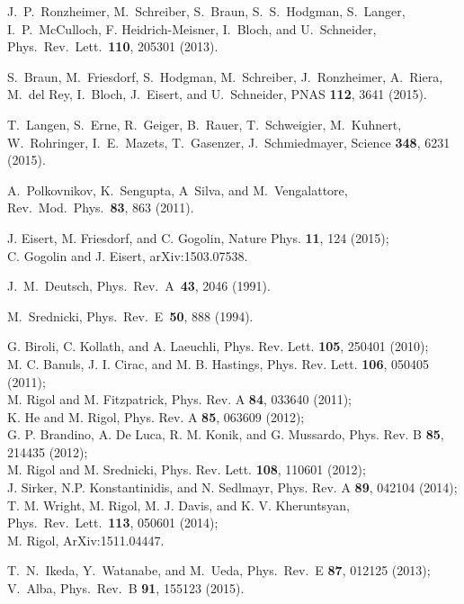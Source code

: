 \documentclass[11pt]{iopart}
\begin{document}
\begin{thebibliography}{99}
J.~P.~Ronzheimer, M.~Schreiber, S.~Braun, S.~S.~Hodgman, S.~Langer, I.~P.~McCulloch,
F. Heidrich-Meisner, I.~Bloch, and U.~Schneider, Phys.\ Rev.\ Lett.\ {\bf 110},
205301 (2013).

S.~Braun, M.~Friesdorf, S.~Hodgman, M.~Schreiber, J.~Ronzheimer, A.~Riera, M.~del Rey,
I.~Bloch, J.~Eisert, and U.~Schneider, PNAS {\bf 112}, 3641 (2015).

T.~Langen, S.~Erne, R.~Geiger, B.~Rauer, T.~Schweigier, M.~Kuhnert, W.~Rohringer,
I.~E.~Mazets, T.~Gasenzer, J.~Schmiedmayer, Science {\bf 348}, 6231 (2015).


A.~Polkovnikov, K.~Sengupta, A~Silva, and M.~Vengalattore, Rev.\ Mod.\ Phys.\
{\bf 83}, 863 (2011).

J. Eisert, M. Friesdorf, and C. Gogolin, Nature Phys. {\bf 11}, 124 (2015);\\
C. Gogolin and J. Eisert,  arXiv:1503.07538.

J.~M.~Deutsch, Phys.\ Rev.\ A\ {\bf 43}, 2046 (1991).

M.~Srednicki, Phys.\ Rev.\ E\ {\bf 50}, 888 (1994).

G. Biroli, C. Kollath, and A. Laeuchli, Phys. Rev. Lett. {\bf 105}, 250401 (2010);\\
M. C. Banuls, J. I. Cirac, and M. B. Hastings, Phys. Rev. Lett. {\bf 106}, 050405 (2011);\\
M. Rigol and M. Fitzpatrick, Phys. Rev. A {\bf 84}, 033640 (2011);\\
K. He and M. Rigol, Phys. Rev. A {\bf 85}, 063609 (2012);\\
G. P. Brandino, A. De Luca, R. M. Konik, and G. Mussardo, Phys. Rev. B {\bf 85}, 214435 (2012);\\
M. Rigol and  M. Srednicki,  Phys. Rev. Lett. {\bf 108}, 110601 (2012);\\
J. Sirker, N.P. Konstantinidis, and N. Sedlmayr, Phys. Rev. A {\bf 89}, 042104 (2014);\\
T. M. Wright, M. Rigol, M. J. Davis, and K. V. Kheruntsyan, Phys.\ Rev.\ Lett.\ {\bf 113},  050601 (2014);\\
M. Rigol, ArXiv:1511.04447. 

T.~N.~Ikeda, Y.~Watanabe, and M.~Ueda, Phys.\ Rev.\ E {\bf 87}, 012125 (2013);\\
V.~Alba, Phys.\ Rev.\ B {\bf 91}, 155123 (2015). 


\end{thebibliography}
\end{document}
